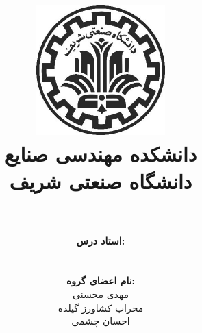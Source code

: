 \title{
	\center
	\includegraphics[width=5cm, height=5cm]{images/shariflogo.jpg} \\
	دانشکده مهندسی صنایع \\
	دانشگاه صنعتی شریف \\
	\CourseName
}
\author{
	\\
	\\
	\textbf{استاد درس:}
	\\
	\Instructor \\[35pt]
	\\
	\textbf{نام اعضای گروه:}
	\\مهدی محسنی 
	\\محراب کشاورز گیلده 
	\\احسان چشمی
	\\[45pt]
}
\date{{\small\Semester}}